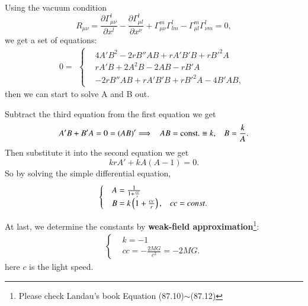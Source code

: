 \documentclass[openany,10pt]{book}
\theoremstyle{definition}
\theoremstyle{definition}
\theoremstyle{remark}
\begin{document}
Using the vacuum condition
\begin{equation}
    R_{\mu\nu}=\frac{\partial \Gamma^l_{\mu\nu}}{\partial x^l}-\frac{\partial \Gamma^l_{\mu l}}{\partial x^\nu}+\Gamma^m_{\mu\nu}\Gamma^l_{lm}-\Gamma^m_{\mu l}\Gamma^l_{\nu m}=0,
\end{equation}
we get a set of equations:
\begin{equation}0=
\begin{aligned}\begin{cases}
    &4A'B^2-2rB''AB+rA'B'B+rB'^2A\\
    &rA'B+2A^2B-2AB-rB'A\\
    &-2rB''AB+rA'B'B+rB'^2A-4B'AB,
    \end{cases}
\end{aligned}
\end{equation}
then we can start to solve A and B out.

Subtract the third equation from the first equation we get
\begin{equation}
    A'B+B'A=0=(AB)'  \Longrightarrow \hspace{3mm} AB={\rm {const}}.\equiv k,\hspace{3mm} B=\frac{k}{A}.
\end{equation}
Then substitute it into the second equation we get
\begin{equation}
    krA'+kA(A-1)=0.
\end{equation}
So by solving the simple differential equation,
\begin{equation}
\begin{aligned}\begin{cases}
    &A=\frac{1}{1+\frac{cc}{r}}\\
    &B=k\left(1+\frac{cc}{r}\right), \hspace{3mm} cc=const.
    \end{cases}
\end{aligned}
\end{equation}


At last, we determine the constants by {\bfseries weak-field approximation}\footnote{Please check Landau's book Equation (87.10)$\sim$(87.12)}:
\begin{equation}
    \begin{aligned}\begin{cases}
    &k=-1\\
    &cc=-\frac{2MG}{c^2}=-2MG.
    \end{cases}
\end{aligned}
\end{equation}
here $c$ is the light speed.
\end{document}
